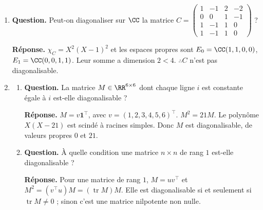 \documentclass[12pt, a4paper]{article}
\begin{document}
\begin{enumerate}[label=9.\arabic*., start=94]
\begin{minipage}[t]{\linewidth}
\begin{enumerate}[\arabic*.]
  \item \textbf{Question.} Calculer $(M-2I_3)^2$, puis $(M-2I_3)^n$ et en déduire $M^n$.
\par\smallskip
\textbf{Réponse.} Pour $N=M-2I_3$, $N^2=0$.
        Donc $N^0=I_3$, $N^1=N$, $N^n=0$ si $n\geq2$.
        $\therefore M^0=I_3$ et $M^n=2^nI_3+n2^{n-1}N$ pour $n\geq1$.

\end{enumerate}
\end{minipage}

  \item \begin{minipage}[t]{\linewidth}\raggedright
\textbf{Question.} Peut-on diagonaliser sur $\CC$ la matrice $C=\begin{pmatrix}1&-1&2&-2\\0&0&1&-1\\1&-1&1&0\\1&-1&1&0\end{pmatrix}$ ?
\par\smallskip
\textbf{Réponse.} $\chi_C=X^2(X-1)^2$ et les espaces propres sont
    $E_0=\CC(1,1,0,0)$, $E_1=\CC(0,0,1,1)$.
    Leur somme a dimension $2<4$.
    $\therefore C$ n'est pas diagonalisable.
\end{minipage}

  \item \begin{minipage}[t]{\linewidth}\raggedright
\begin{enumerate}[\arabic*.]
        \item \textbf{Question.} La matrice $M\in\RR^{6\times6}$ dont chaque ligne $i$ est constante égale à $i$ est-elle diagonalisable ?
\par\smallskip
\textbf{Réponse.} $M=v\boldsymbol1^\top$, avec $v=(1,2,3,4,5,6)^\top$.
        $M^2=21M$. Le polynôme $X(X-21)$ est scindé à racines simples.
        Donc $M$ est diagonalisable, de valeurs propres $0$ et $21$.

  \item \textbf{Question.} À quelle condition une matrice $n\times n$ de rang $1$ est-elle diagonalisable ?
\par\smallskip
\textbf{Réponse.} Pour une matrice de rang $1$, $M=uv^\top$ et $M^2=(v^\top u)M=(\operatorname{tr}M)M$.
        Elle est diagonalisable si et seulement si $\operatorname{tr}M\neq0$ ; sinon c'est une matrice nilpotente non nulle.

\end{enumerate}
\end{minipage}


\end{enumerate}
\end{document}
